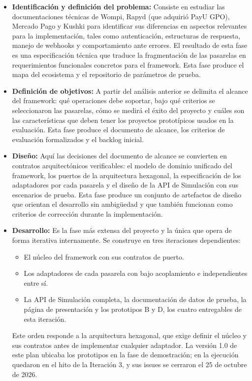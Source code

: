 \begin{itemize}
  \item \textbf{Identificación y definición del problema:} Consiste en estudiar las documentaciones técnicas de Wompi, Rapyd (que adquirió PayU GPO), Mercado Pago y Kushki para identificar sus diferencias en aspectos relevantes para la implementación, tales como autenticación, estructuras de respuesta, manejo de webhooks y comportamiento ante errores. El resultado de esta fase es una especificación técnica que traduce la fragmentación de las pasarelas en requerimientos funcionales concretos para el framework. Esta fase produce el mapa del ecosistema y el repositorio de parámetros de prueba.
  \item \textbf{Definición de objetivos:} A partir del análisis anterior se delimita el alcance del framework: qué operaciones debe soportar, bajo qué criterios se seleccionaron las pasarelas, cómo se medirá el éxito del proyecto y cuáles son las características que deben tener los proyectos prototípicos usados en la evaluación. Esta fase produce el documento de alcance, los criterios de evaluación formalizados y el backlog inicial.
  \item \textbf{Diseño:} Aquí las decisiones del documento de alcance se convierten en contratos arquitectónicos verificables: el modelo de dominio unificado del framework, los puertos de la arquitectura hexagonal, la especificación de los adaptadores por cada pasarela y el diseño de la API de Simulación con sus escenarios de prueba. Esta fase produce un conjunto de artefactos de diseño que orientan el desarrollo sin ambigüedad y que también funcionan como criterios de corrección durante la implementación.
  \item \textbf{Desarrollo:} Es la fase más extensa del proyecto y la única que opera de forma iterativa internamente. Se construye en tres iteraciones dependientes:
  \begin{itemize}
    \item El núcleo del framework con sus contratos de puerto.
    \item Los adaptadores de cada pasarela con bajo acoplamiento e independientes entre sí.
    \item La API de Simulación completa, la documentación de datos de prueba, la página de presentación y los prototipos B y D, los cuatro entregables de esta iteración.
  \end{itemize}
  Este orden responde a la arquitectura hexagonal, que exige definir el núcleo y sus contratos antes de implementar cualquier adaptador. La versión 1.0 de este plan ubicaba los prototipos en la fase de demostración; en la ejecución quedaron en el hito de la Iteración 3, y sus issues se cerraron el 25 de octubre de 2026.

\end{itemize}
